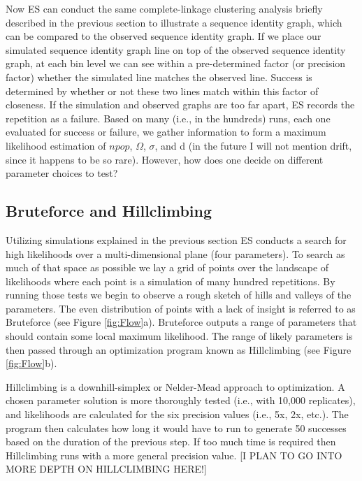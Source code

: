 Now ES can conduct the same complete-linkage clustering analysis briefly described in the previous section to illustrate a sequence identity graph, which can be compared to the observed sequence identity graph.
If we place our simulated sequence identity graph line on top of the observed sequence identity graph, at each bin level we can see within a pre-determined factor (or precision factor) whether the simulated line matches the observed line.
Success is determined by whether or not these two lines match within this factor of closeness.
If the simulation and observed graphs are too far apart, ES records the repetition as a failure.
Based on many (i.e., in the hundreds) runs, each one evaluated for success or failure, we gather information to form a maximum likelihood estimation of $npop$, $\Omega$, $\sigma$, and d (in the future I will not mention drift, since it happens to be so rare). However, how does one decide on different parameter choices to test?

\subsection*{Bruteforce and Hillclimbing}
Utilizing simulations explained in the previous section ES conducts a search for high likelihoods over a multi-dimensional plane (four parameters).
To search as much of that space as possible we lay a grid of points over the landscape of likelihoods where each point is a simulation of many hundred repetitions.
By running those tests we begin to observe a rough sketch of hills and valleys of the parameters.
The even distribution of points with a lack of insight is referred to as Bruteforce (see Figure \ref{fig:Flow}a).
Bruteforce outputs a range of parameters that should contain some local maximum likelihood.
The range of likely parameters is then passed through an optimization program known as Hillclimbing (see Figure \ref{fig:Flow}b).

Hillclimbing is a downhill-simplex or Nelder-Mead approach to optimization.
A chosen parameter solution is more thoroughly tested (i.e., with 10,000 replicates), and likelihoods are calculated for the six precision values (i.e., 5x, 2x, etc.).
The program then calculates how long it would have to run to generate 50 successes based on the duration of the previous step.
If too much time is required then Hillclimbing runs with a more general precision value.
[I PLAN TO GO INTO MORE DEPTH ON HILLCLIMBING HERE!]


